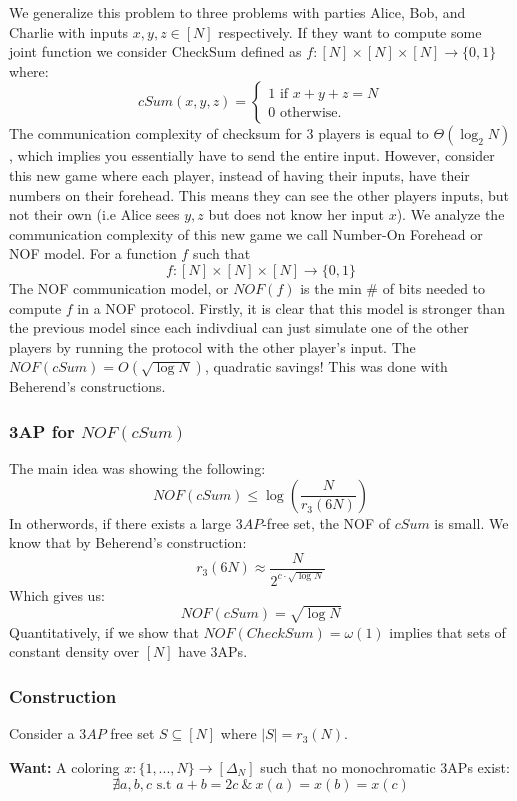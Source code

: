 \documentclass[11pt]{article}
\theoremstyle{definition}
\begin{document}
We generalize this problem to three problems with parties Alice, Bob, and Charlie with inputs $x,y,z \in [N]$ respectively. If they want to compute some joint function we consider CheckSum defined as $f: [N] \times [N] \times [N] \rightarrow \{0,1\}$ where:
$$
cSum(x,y,z) = \begin{cases}
    1 \text{ if } x + y + z = N\\
    0 \text{ otherwise.}
\end{cases}
$$
The communication complexity of checksum for 3 players is equal to $\Theta(\log_2 N)$, which implies you essentially have to send the entire input. However, consider this new game where each player, instead of having their inputs, have their numbers on their forehead. This means they can see the other players inputs, but not their own (i.e Alice sees $y,z$ but does not know her input $x$). We analyze the communication complexity of this new game we call Number-On Forehead or NOF model. For a function $f$ such that
$$f: [N] \times [N] \times [N] \rightarrow \{0,1\}$$
The NOF communication model, or $NOF(f)$ is the min \# of bits needed to compute $f$ in a NOF protocol. Firstly, it is clear that this model is stronger than the previous model since each indivdiual can just simulate one of the other players by running the protocol with the other player's input. The $NOF(cSum) = O(\sqrt{\log N})$, quadratic savings! This was done with Beherend's constructions.
\subsubsection{3AP for $NOF(cSum)$}
The main idea was showing the following:
$$NOF(cSum) \leq \log (\frac{N}{r_3(6N)})$$
In otherwords, if there exists a large $3AP$-free set, the NOF of $cSum$ is small. We know that by Beherend's construction:
$$r_3(6N) \approx \frac{N}{2^{c \cdot \sqrt{\log N}}}$$
Which gives us:
$$NOF(cSum) = \sqrt{\log N}$$
Quantitatively, if we show that $NOF(CheckSum) = \omega(1)$ implies that sets of constant density over $[N]$ have 3APs.
\subsubsection{Construction}
Consider a $3AP$ free set $S \subseteq [N]$ where $|S| = r_3(N)$.
\bigskip

\textbf{Want:} A coloring $x: \{1,...,N\} \rightarrow [\Delta_N]$ such that no monochromatic 3APs exist:
$$\nexists a,b,c \text{ s.t } a + b = 2c\ \& \ x(a) = x(b) = x(c)$$
\bigskip
\end{document}
